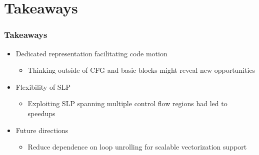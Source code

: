 \documentclass[aspectratio=169]{beamer}
\begin{document}
\section{Takeaways}
\begin{frame}
  \frametitle{Takeaways}

  \begin{itemize}
    \item Dedicated representation facilitating code motion
    \begin{itemize}
      \item Thinking outside of CFG and basic blocks might reveal new opportunities
    \end{itemize}
    \pause
    \item Flexibility of SLP
    \begin{itemize}
      \item Exploiting SLP spanning multiple control flow regions had led to speedups
    \end{itemize}
    \pause
    \item Future directions
    \begin{itemize}
      \item Reduce dependence on loop unrolling for scalable vectorization support
    \end{itemize}
  \end{itemize}
\end{frame}
\end{document}
